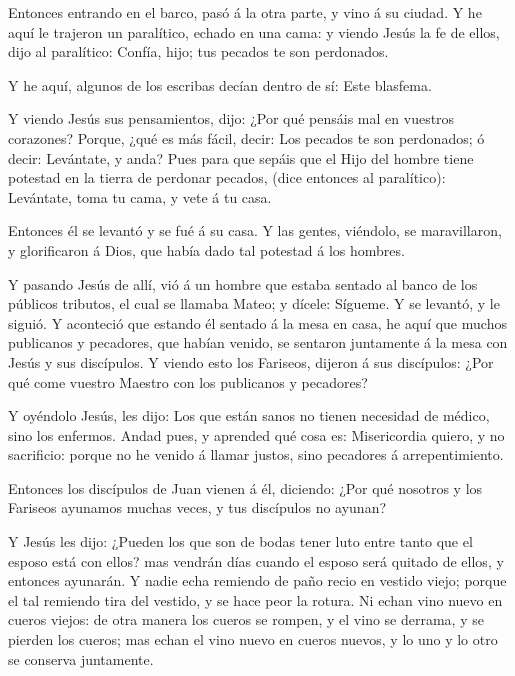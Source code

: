  Entonces entrando en el barco, pasó á la otra parte, y vino
á su ciudad.  Y he aquí le trajeron un paralítico, echado en
una cama: y viendo Jesús la fe de ellos, dijo al paralítico: Confía,
hijo; tus pecados te son perdonados.

 Y he aquí, algunos de los escribas decían dentro de sí:
Este blasfema.

 Y viendo Jesús sus pensamientos, dijo: ¿Por qué pensáis mal
en vuestros corazones?  Porque, ¿qué es más fácil, decir:
Los pecados te son perdonados; ó decir: Levántate, y anda? 
Pues para que sepáis que el Hijo del hombre tiene potestad en la tierra
de perdonar pecados, (dice entonces al paralítico): Levántate, toma tu
cama, y vete á tu casa.

 Entonces él se levantó y se fué á su casa.  Y
las gentes, viéndolo, se maravillaron, y glorificaron á Dios, que había
dado tal potestad á los hombres.

 Y pasando Jesús de allí, vió á un hombre que estaba sentado
al banco de los públicos tributos, el cual se llamaba Mateo; y dícele:
Sígueme. Y se levantó, y le siguió.  Y aconteció que
estando él sentado á la mesa en casa, he aquí que muchos publicanos y
pecadores, que habían venido, se sentaron juntamente á la mesa con Jesús
y sus discípulos.  Y viendo esto los Fariseos, dijeron á
sus discípulos: ¿Por qué come vuestro Maestro con los publicanos y
pecadores?

 Y oyéndolo Jesús, les dijo: Los que están sanos no tienen
necesidad de médico, sino los enfermos.  Andad pues, y
aprended qué cosa es: Misericordia quiero, y no sacrificio: porque no he
venido á llamar justos, sino pecadores á arrepentimiento.

 Entonces los discípulos de Juan vienen á él, diciendo:
¿Por qué nosotros y los Fariseos ayunamos muchas veces, y tus discípulos
no ayunan?

 Y Jesús les dijo: ¿Pueden los que son de bodas tener luto
entre tanto que el esposo está con ellos? mas vendrán días cuando el
esposo será quitado de ellos, y entonces ayunarán.  Y nadie
echa remiendo de paño recio en vestido viejo; porque el tal remiendo
tira del vestido, y se hace peor la rotura.  Ni echan vino
nuevo en cueros viejos: de otra manera los cueros se rompen, y el vino
se derrama, y se pierden los cueros; mas echan el vino nuevo en cueros
nuevos, y lo uno y lo otro se conserva juntamente.


